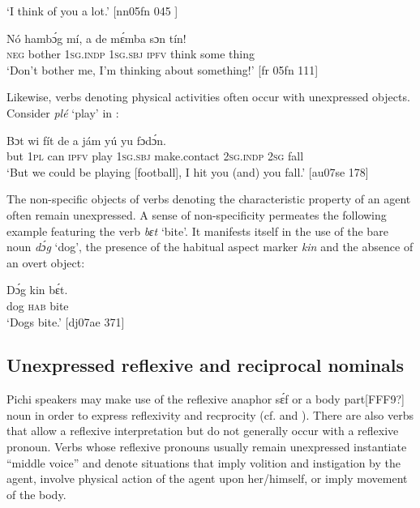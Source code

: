 \glt ‘I think of you a lot.’ [nn05fn 045 ]
\z


\ea%
    \label{ex:key:1294}
    \gll Nó  hambɔ́g  mí,    a    de  mɛ́mba  sɔn    tín!\\
\textsc{neg}  bother  \textsc{1sg.indp}  \textsc{1sg.sbj}  \textsc{ipfv}  think  some  thing\\

\glt ‘Don’t bother me, I’m thinking about something!’ [fr 05fn 111]
\z

Likewise, verbs denoting physical activities often occur with unexpressed objects. Consider \textit{plé} ‘play’ in : 


\ea%
    \label{ex:key:1295}
    \gll Bɔt  wi  fít  de    a    jám        yú     yu  fɔdɔ́n.\\
but  \textsc{1pl}  can  \textsc{ipfv}  play  \textsc{1sg.sbj}  make.contact    \textsc{2sg.indp}  \textsc{2sg}  fall\\

\glt ‘But we could be playing [football], I hit you (and) you fall.’ [au07se 178]
\z

The non-specific objects of verbs denoting the characteristic property of an agent often remain unexpressed. A sense of non-specificity permeates the following example featuring the verb \textit{bɛt} ‘bite’. It manifests itself in the use of the bare noun \textit{dɔ́g} ‘dog’, the presence of the habitual aspect marker \textit{kin} and the absence of an overt object:


\ea%
    \label{ex:key:1296}
    \gll Dɔ́g    kin  bɛ́t.\\
dog    \textsc{hab}  bite\\

\glt ‘Dogs bite.’ [dj07ae 371]
\z

\subsection{Unexpressed reflexive and reciprocal nominals}\label{sec:9.4.3}

Pichi speakers may make use of the reflexive anaphor sɛ́f or a body part[FFF9?] noun in order to express reflexivity and recprocity (cf.  and ). There are also verbs that allow a reflexive interpretation but do not generally occur with a reflexive pronoun. Verbs whose reflexive pronouns usually remain unexpressed instantiate “middle voice” \citep{Kemmer1993} and denote situations that imply volition and instigation by the agent, involve physical action of the agent upon her/himself, or imply movement of the body.


